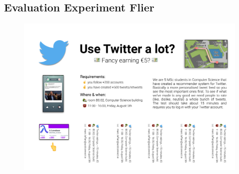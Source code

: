\documentclass{article}
\begin{document}
\newpage

\subsection{Evaluation Experiment Flier} \label{full-size-poster}
\begin{figure}[H]
    \centering
    \includegraphics[width=1.5\textwidth,angle=90,origin=c]{evaluation_poster}
\end{figure}


\newpage
\end{document}
